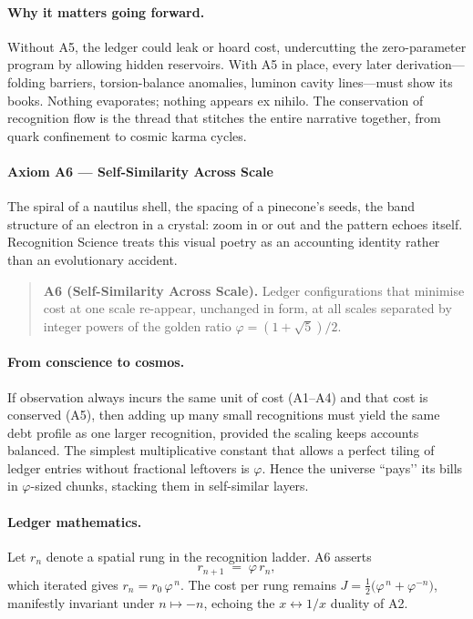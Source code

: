 \documentclass[11pt,oneside]{book}
\begin{document}
\paragraph*{Why it matters going forward.}
Without A5, the ledger could leak or hoard cost, undercutting the
zero-parameter program by allowing hidden reservoirs.  
With A5 in place, every later derivation—folding barriers,
torsion-balance anomalies, luminon cavity lines—must show its books.
Nothing evaporates; nothing appears ex nihilo.  The conservation of
recognition flow is the thread that stitches the entire narrative
together, from quark confinement to cosmic karma cycles.

\bigskip
\paragraph{Axiom A6 — Self-Similarity Across Scale}
\label{ssec:axiom-A6}

The spiral of a nautilus shell, the spacing of a pinecone’s seeds, the
band structure of an electron in a crystal: zoom in or out and the
pattern echoes itself.  Recognition Science treats this visual poetry as
an accounting identity rather than an evolutionary accident.

\begin{quote}
\textbf{A6 (Self-Similarity Across Scale).}  
Ledger configurations that minimise cost at one scale re-appear,
unchanged in form, at all scales separated by integer powers of the
golden ratio \(\varphi = (1+\sqrt5)/2\).
\end{quote}

\paragraph*{From conscience to cosmos.}
If observation always incurs the same unit of cost (A1–A4) and that cost
is conserved (A5), then adding up many small recognitions must yield the
same debt profile as one larger recognition, provided the scaling keeps
accounts balanced.  The simplest multiplicative constant that allows a
perfect tiling of ledger entries without fractional leftovers is
\(\varphi\).  Hence the universe “pays’’ its bills in \(\varphi\)-sized
chunks, stacking them in self-similar layers.

\paragraph*{Ledger mathematics.}
Let \(r_n\) denote a spatial rung in the recognition ladder.  A6 asserts
\[
  r_{n+1} \;=\; \varphi\, r_n,
\]
which iterated gives \(r_n = r_0\,\varphi^{\,n}\).  The cost per rung
remains
\(J=\tfrac12\!\bigl(\varphi^{\,n} + \varphi^{-n}\bigr)\),  
manifestly invariant under \(n \mapsto -n\), echoing the
\(x\!\leftrightarrow\!1/x\) duality of A2.
\end{document}
